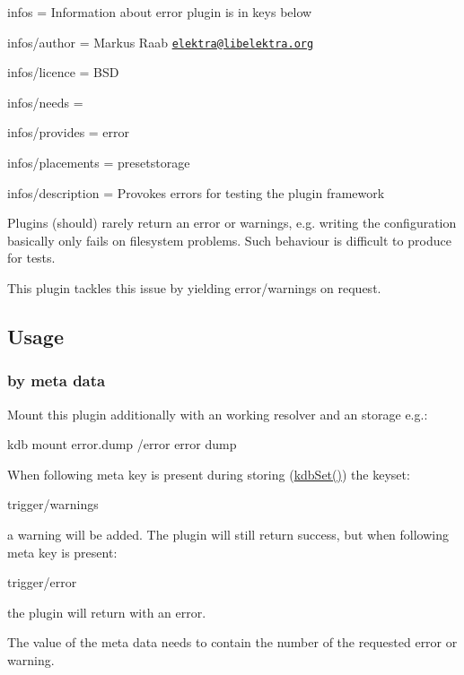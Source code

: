 
\begin{DoxyItemize}
\item infos = Information about error plugin is in keys below
\item infos/author = Markus Raab \href{mailto:elektra@libelektra.org}{\tt elektra@libelektra.\+org}
\item infos/licence = B\+S\+D
\item infos/needs =
\item infos/provides = error
\item infos/placements = presetstorage
\item infos/description = Provokes errors for testing the plugin framework
\end{DoxyItemize}

Plugins (should) rarely return an error or warnings, e.\+g. writing the configuration basically only fails on filesystem problems. Such behaviour is difficult to produce for tests.

This plugin tackles this issue by yielding error/warnings on request.

\subsection*{Usage}

\subsubsection*{by meta data}

Mount this plugin additionally with an working resolver and an storage e.\+g.\+: \begin{DoxyVerb}    kdb mount error.dump /error error dump
\end{DoxyVerb}


When following meta key is present during storing (\hyperlink{group__kdb_ga11436b058408f83d303ca5e996832bcf}{kdb\+Set()}) the keyset\+: \begin{DoxyVerb}    trigger/warnings
\end{DoxyVerb}


a warning will be added. The plugin will still return success, but when following meta key is present\+: \begin{DoxyVerb}    trigger/error
\end{DoxyVerb}


the plugin will return with an error.

The value of the meta data needs to contain the number of the requested error or warning.

